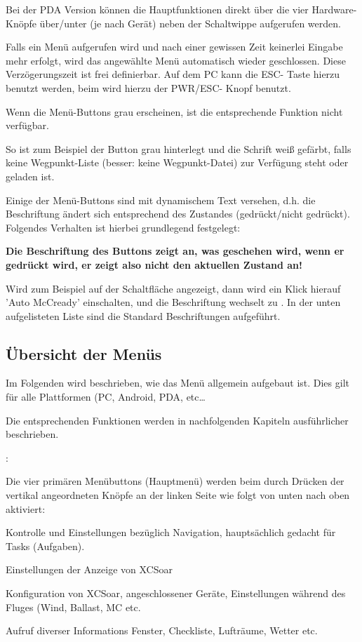 Bei der PDA Version können die Hauptfunktionen direkt über die vier Hardware-Knöpfe über/unter (je nach Gerät) neben der Schaltwippe aufgerufen werden.

Falls ein Menü aufgerufen wird und nach einer gewissen Zeit keinerlei Eingabe mehr erfolgt, wird das angewählte Menü automatisch wieder geschlossen.  Diese Verzögerungszeit ist frei definierbar.  Auf dem \textsf{PC} kann die ESC- Taste hierzu benutzt werden, beim  \al wird hierzu der PWR/ESC- Knopf benutzt.

Wenn die Menü-Buttons grau erscheinen, ist die entsprechende Funktion nicht verfügbar.

So ist zum Beispiel der Button \textcolor{white}{} grau hinterlegt und die Schrift weiß gefärbt, falls keine Wegpunkt-Liste (besser: keine Wegpunkt-Datei) zur Verfügung steht oder geladen ist.

Einige der Menü-Buttons sind mit dynamischem Text versehen, d.h. die Beschriftung ändert sich entsprechend des Zustandes (gedrückt/nicht gedrückt). Folgendes Verhalten ist hierbei grundlegend festgelegt:


\textbf{Die Beschriftung des Buttons zeigt an,\textcolor[rgb]{0.72,0.03,0.20}{ was geschehen wird}, wenn er \achtung gedrückt wird, er zeigt also nicht den aktuellen Zustand an!}

Wird zum Beispiel auf der Schaltfläche   angezeigt, dann wird ein Klick hierauf   'Auto
McCready' einschalten, und die Beschriftung wechselt zu  .
In der unten aufgelisteten Liste sind die Standard Beschriftungen aufgeführt.

\subsection*{Übersicht der Menüs}
Im Folgenden wird beschrieben, wie das Menü allgemein aufgebaut ist.
Dies gilt für alle Plattformen (\textsf{PC}, Android, \al PDA, etc\dots

Die entsprechenden Funktionen werden in nachfolgenden Kapiteln ausführlicher beschrieben.

\textsf{\al}:

Die vier primären Menübuttons (Hauptmenü) werden beim \al durch Drücken der vertikal angeordneten Knöpfe an der linken Seite wie folgt von unten nach oben aktiviert:

\begin{jspecs}
\item[\button{Nav}]      Kontrolle und Einstellungen bezüglich Navigation, hauptsächlich gedacht für Tasks (Aufgaben).
\item[\button{Anzeige}]  Einstellungen der Anzeige von \textsf{XCSoar}
\item[\button{Konfig.}]  Konfiguration von \textsf{XCSoar}, angeschlossener Geräte,
                                      Einstellungen während des Fluges (Wind, Ballast, MC etc.\
\item[\button{Info}]     Aufruf diverser Informations Fenster,  Checkliste, Lufträume, Wetter etc.\
\end{jspecs}

